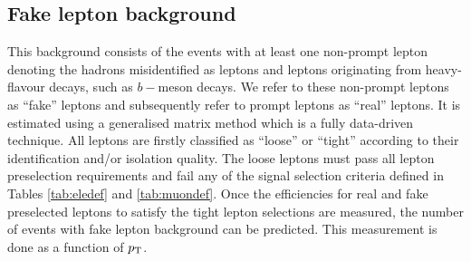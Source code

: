 \subsection{Fake lepton background}
\label{sec:fakebg}

This background consists of the events with at least one non-prompt lepton denoting the hadrons misidentified as leptons and leptons originating from heavy-flavour decays, such as $b-$meson decays. We refer to these non-prompt leptons as ``fake'' leptons and subsequently refer to prompt leptons as ``real'' leptons. It is estimated using a generalised matrix method \cite{Arguin:1558979,Gillam:2014xua} which is a fully data-driven technique. All leptons are firstly classified as ``loose'' or ``tight'' according to their identification and/or isolation quality. The loose leptons must pass all lepton preselection requirements and fail any of the signal selection criteria defined in Tables \ref{tab:eledef} and \ref{tab:muondef}. Once the efficiencies for real and fake preselected leptons to satisfy the tight lepton selections are measured, the number of events with fake lepton background can be predicted. This measurement is done as a function of $p_{\mathrm{T}}$. %



